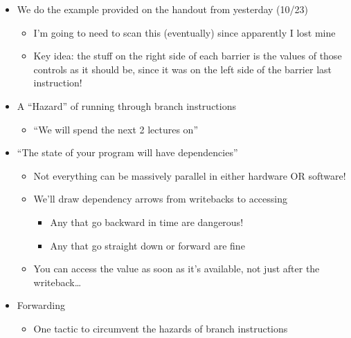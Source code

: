 \documentclass{article}
\begin{document}
\begin{itemize}
\item  We do the example provided on the handout from yesterday (10/23)
\begin{itemize}
\item  I’m going to need to scan this (eventually) since apparently I lost mine
\item  Key idea: the stuff on the right side of each barrier is the values of those controls as it should be, since it was on the left side of the barrier last instruction!
\end{itemize}
\item  A “Hazard” of running through branch instructions
\begin{itemize}
\item  “We will spend the next 2 lectures on”
\end{itemize}
\item  “The state of your program will have dependencies”
\begin{itemize}
\item  Not everything can be massively parallel in either hardware OR software!
\item  We’ll draw dependency arrows from writebacks to accessing
\begin{itemize}
\item  Any that go backward in time are dangerous!
\item  Any that go straight down or forward are fine
\end{itemize}
\item  You can access the value as soon as it’s available, not just after the writeback…
\end{itemize}
\item  Forwarding 
\begin{itemize}
\item  One tactic to circumvent the hazards of branch instructions
\end{itemize}
\end{itemize}
\end{document}
